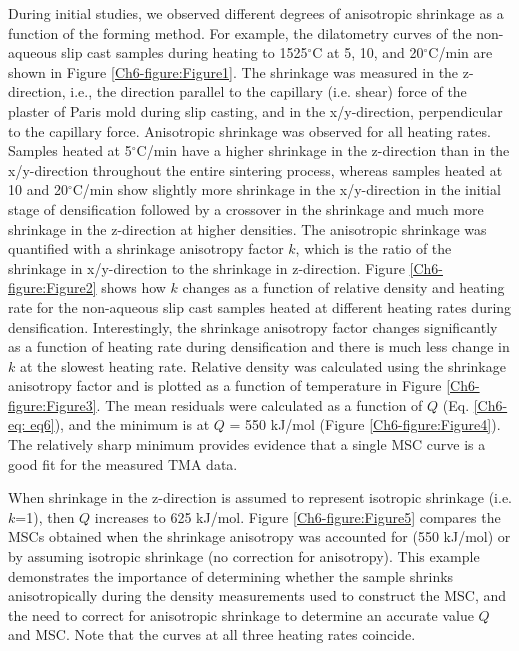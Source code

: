 During initial studies, we observed different degrees of anisotropic shrinkage as a function of the forming method. For example, the dilatometry curves of the non-aqueous slip cast samples during heating to 1525$^{\circ}$C at 5, 10, and 20$^{\circ}$C/min are shown in Figure \ref{Ch6-figure:Figure1}. The shrinkage was measured in the z-direction, i.e., the direction parallel to the capillary (i.e. shear) force of the plaster of Paris mold during slip casting, and in the x/y-direction, perpendicular to the capillary force. Anisotropic shrinkage was observed for all heating rates. Samples heated at 5$^{\circ}$C/min have a higher shrinkage in the z-direction than in the x/y-direction throughout the entire sintering process, whereas samples heated at 10 and 20$^{\circ}$C/min show slightly more shrinkage in the x/y-direction in the initial stage of densification followed by a crossover in the shrinkage and much more shrinkage in the z-direction at higher densities. The anisotropic shrinkage was quantified with a shrinkage anisotropy factor $k$, which is the ratio of the shrinkage in x/y-direction to the shrinkage in z-direction. Figure \ref{Ch6-figure:Figure2} shows how $k$ changes as a function of relative density and heating rate for the non-aqueous slip cast samples heated at different heating rates during densification. Interestingly, the shrinkage anisotropy factor changes significantly as a function of heating rate during densification and there is much less change in $k$ at the slowest heating rate. Relative density was calculated using the shrinkage anisotropy factor and is plotted as a function of temperature in Figure \ref{Ch6-figure:Figure3}. The mean residuals were calculated as a function of $Q$ (Eq. \ref{Ch6-eq: eq6}), and the minimum is at $Q$ = 550 kJ/mol (Figure \ref{Ch6-figure:Figure4}). The relatively sharp minimum provides evidence that a single MSC curve is a good fit for the measured TMA data. 

When shrinkage in the z-direction is assumed to represent isotropic shrinkage (i.e. $k$=1), then $Q$ increases to 625 kJ/mol. Figure \ref{Ch6-figure:Figure5} compares the MSCs obtained when the shrinkage anisotropy was accounted for (550 kJ/mol) or by assuming isotropic shrinkage (no correction for anisotropy). This example demonstrates the importance of determining whether the sample shrinks anisotropically during the density measurements used to construct the MSC, and the need to correct for anisotropic shrinkage to determine an accurate value $Q$ and MSC. Note that the curves at all three heating rates coincide.


